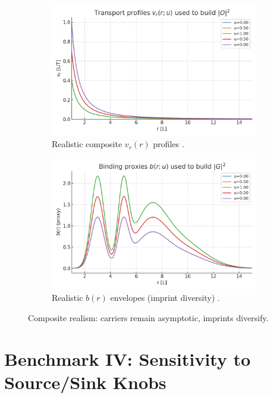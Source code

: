 \documentclass[12pt,a4paper,oneside]{scrreprt}
\begin{document}
\begin{figure}[htbp]\centering
  \begin{subfigure}[t]{0.49\linewidth}
    \includegraphics[width=\linewidth]{fig/realism_vr_profiles.png}
    \caption{Realistic composite $v_r(r)$ profiles
      \cite{Bird2002}.}
    \label{fig:real:vr}
  \end{subfigure}\hfill
  \begin{subfigure}[t]{0.49\linewidth}
    \includegraphics[width=\linewidth]{fig/realism_b_profiles.png}
    \caption{Realistic $b(r)$ envelopes (imprint diversity)
      \cite{Schuss2009,Zwanzig2001}.}
    \label{fig:real:b}
  \end{subfigure}
  \caption{Composite realism: carriers remain asymptotic,
  imprints diversify.}
  \label{fig:real:benchmark}
\end{figure}

\chapter{Benchmark IV: Sensitivity to Source/Sink Knobs}
\end{document}
